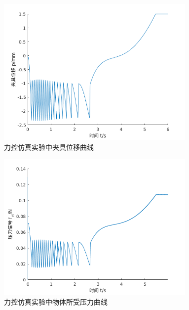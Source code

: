 \begin{figure}[!ht]
  \centering
  \includegraphics[width=9.7cm]{chapter04/pic/p_x}
  \caption{\label{fig:p_x}
    力控仿真实验中夹具位移曲线}
  \vspace{-0.3cm}
\end{figure}

\begin{figure}[!ht]
  \centering
  \includegraphics[width=9.7cm]{chapter04/pic/fn_x}
  \caption{\label{fig:fn_x}
    力控仿真实验中物体所受压力曲线}
  \vspace{-0.3cm}
\end{figure}


